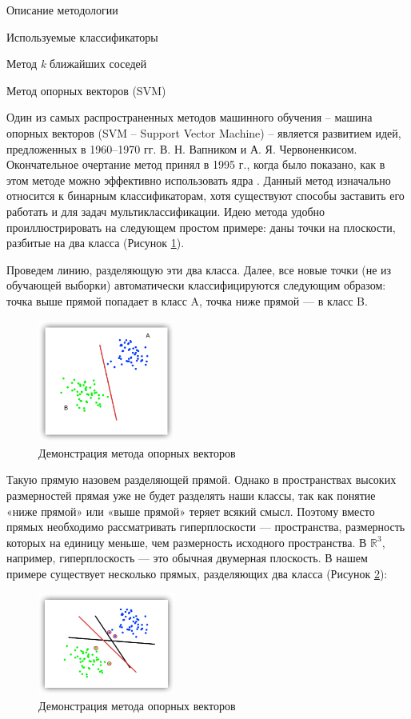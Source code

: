 \begin{section}{Описание методологии}
\begin{subsection}{Используемые классификаторы}
\begin{subsubsection}{Метод \textit{k} ближайших соседей}
    \end{subsubsection}

    \begin{subsubsection}{Метод опорных векторов (SVM)}

      Один из самых распространенных методов машинного обучения – машина опорных векторов (SVM – Support Vector Machine) – является развитием идей, предложенных в 1960–1970 гг. В. Н. Вапником и А. Я. Червоненкисом. Окончательное очертание метод принял в 1995 г., когда было показано, как в этом методе можно эффективно использовать ядра \cite{Cortes}.
Данный метод изначально относится к бинарным классификаторам, хотя существуют способы заставить его работать и для задач мультиклассификации.
Идею метода удобно проиллюстрировать на следующем простом примере: даны точки на плоскости, разбитые на два класса (Рисунок \ref{pic:SVM1}).

  Проведем линию, разделяющую эти два класса. Далее, все новые точки (не из обучающей выборки) автоматически классифицируются следующим образом:
точка выше прямой попадает в класс A,
точка ниже прямой — в класс B.

\begin{figure}[ht!]
\centering
\includegraphics[width=0.4\textwidth]{pics/SVM1}
\caption{Демонстрация метода опорных векторов}
\label{pic:SVM1}
\end{figure}

Такую прямую назовем разделяющей прямой. Однако в пространствах высоких размерностей прямая уже не будет разделять наши классы, так как понятие «ниже прямой» или «выше прямой» теряет всякий смысл. Поэтому вместо прямых необходимо рассматривать гиперплоскости — пространства, размерность которых на единицу меньше, чем размерность исходного пространства. В $\mathbb{R}^3$, например, гиперплоскость — это обычная двумерная плоскость.
В нашем примере существует несколько прямых, разделяющих два класса (Рисунок \ref{pic:SVM2}):

\begin{figure}[ht!]
\centering
\includegraphics[width=0.4\textwidth]{pics/SVM2}
\caption{Демонстрация метода опорных векторов}
\label{pic:SVM2}
\end{figure}


\end{subsubsection}
\end{subsection}
\end{section}
